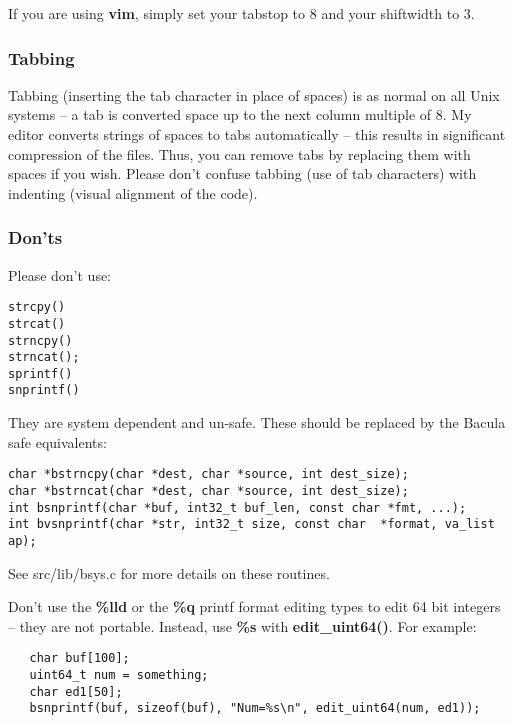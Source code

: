 If you are using {\bf vim}, simply set your tabstop to 8 and your shiftwidth
to 3. 

\subsubsection*{Tabbing}

Tabbing (inserting the tab character in place of spaces) is as normal on all
Unix systems -- a tab is converted space up to the next column multiple of 8.
My editor converts strings of spaces to tabs automatically -- this results in
significant compression of the files. Thus, you can remove tabs by replacing
them with spaces if you wish. Please don't confuse tabbing (use of tab
characters) with indenting (visual alignment of the code). 

\subsubsection*{Don'ts}

Please don't use: 

\footnotesize
\begin{verbatim}
strcpy()
strcat()
strncpy()
strncat();
sprintf()
snprintf()
\end{verbatim}
\normalsize

They are system dependent and un-safe. These should be replaced by the Bacula
safe equivalents: 

\footnotesize
\begin{verbatim}
char *bstrncpy(char *dest, char *source, int dest_size);
char *bstrncat(char *dest, char *source, int dest_size);
int bsnprintf(char *buf, int32_t buf_len, const char *fmt, ...);
int bvsnprintf(char *str, int32_t size, const char  *format, va_list ap);
\end{verbatim}
\normalsize

See src/lib/bsys.c for more details on these routines. 

Don't use the {\bf \%lld} or the {\bf \%q} printf format editing types to edit
64 bit integers -- they are not portable. Instead, use {\bf \%s} with {\bf
edit\_uint64()}. For example: 

\footnotesize
\begin{verbatim}
   char buf[100];
   uint64_t num = something;
   char ed1[50];
   bsnprintf(buf, sizeof(buf), "Num=%s\n", edit_uint64(num, ed1));
\end{verbatim}
\normalsize

